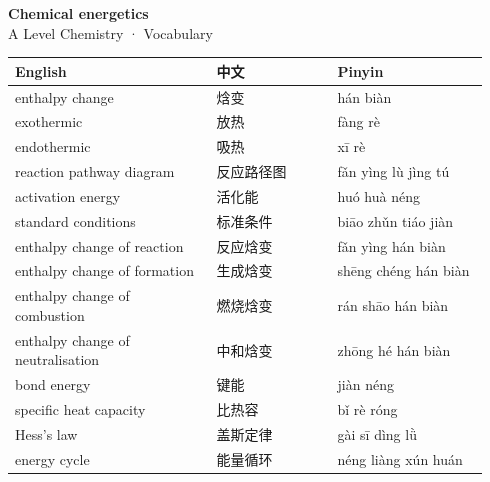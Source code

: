 \documentclass[11pt]{article}
\begin{document}
\begin{center}
  {\LARGE\bfseries Chemical energetics}\\[0.35em]
  {\large A Level Chemistry · Vocabulary}
\end{center}
\vspace{0.6em}

\begin{longtable}{@{}p{0.40\linewidth}p{0.24\linewidth}p{0.30\linewidth}@{}}
\toprule
\textbf{English} & \textbf{中文} & \textbf{Pinyin} \\
\midrule
\endhead
\bottomrule
\endlastfoot
enthalpy change & 焓变 & hán biàn \\
exothermic & 放热 & fàng rè \\
endothermic & 吸热 & xī rè \\
reaction pathway diagram & 反应路径图 & fǎn yìng lù jìng tú \\
activation energy & 活化能 & huó huà néng \\
standard conditions & 标准条件 & biāo zhǔn tiáo jiàn \\
enthalpy change of reaction & 反应焓变 & fǎn yìng hán biàn \\
enthalpy change of formation & 生成焓变 & shēng chéng hán biàn \\
enthalpy change of combustion & 燃烧焓变 & rán shāo hán biàn \\
enthalpy change of neutralisation & 中和焓变 & zhōng hé hán biàn \\
bond energy & 键能 & jiàn néng \\
specific heat capacity & 比热容 & bǐ rè róng \\
Hess's law & 盖斯定律 & gài sī dìng lǜ \\
energy cycle & 能量循环 & néng liàng xún huán \\
\end{longtable}
\end{document}
